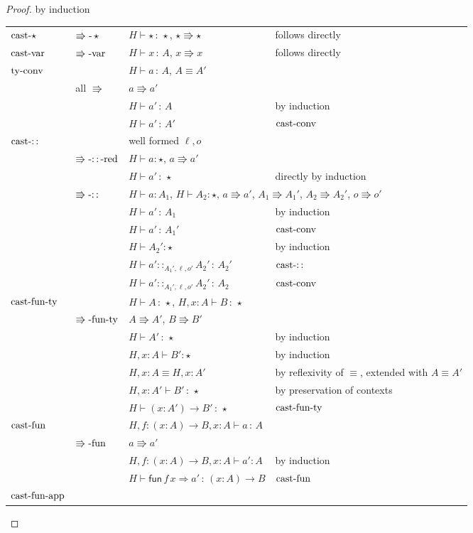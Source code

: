 \begin{proof}
by induction

\begin{tabular}{llll}
$\operatorname{cast-\star}$ & $\operatorname{\Rrightarrow-}\star$ & $H\vdash\star\,:\,\star$, $\star\Rrightarrow\star$ & follows directly\tabularnewline
$\operatorname{cast-var}$ & $\operatorname{\Rrightarrow-var}$ & $H\vdash x\,:\,A$, $x\Rrightarrow x$ & follows directly\tabularnewline
$\operatorname{ty-conv}$ &  & $H\vdash a\,:\,A$, $A\equiv A'$ & \tabularnewline
 & all $\Rrightarrow$ & $a\Rrightarrow a'$ & \tabularnewline
 &  & $H\vdash a'\,:\,A$ & by induction\tabularnewline
 &  & $H\vdash a'\,:\,A'$ & $\operatorname{cast-conv}$\tabularnewline
$\operatorname{cast-::}$ &  & well formed $\ell,o$ & \tabularnewline
 & $\operatorname{\Rrightarrow-::-red}$ & $H\vdash a:\star$, $a\Rrightarrow a'$ & \tabularnewline
 &  & $H\vdash a'\,:\,\star$ & directly by induction\tabularnewline
 & $\operatorname{\Rrightarrow-::}$ & \multicolumn{2}{l}{$H\vdash a:A_{1}$, $H\vdash A_{2}:\star$, $a\Rrightarrow a'$, $A_{1}\Rrightarrow A_{1}'$,
$A_{2}\Rrightarrow A_{2}'$, $o\Rrightarrow o'$}\tabularnewline
 &  & $H\vdash a'\,:\,A_{1}$ & by induction\tabularnewline
 &  & $H\vdash a'\,:\,A_{1}'$ & $\operatorname{cast-conv}$\tabularnewline
 &  & $H\vdash A_{2}':\star$ & by induction\tabularnewline
 &  & $H\vdash a'::_{A_{1}',\ell,o'}A_{2}'\,:\,A_{2}'$ & $\operatorname{cast-::}$\tabularnewline
 &  & $H\vdash a'::_{A_{1}',\ell,o'}A_{2}'\,:\,A_{2}$ & $\operatorname{cast-conv}$\tabularnewline
$\operatorname{cast-fun-ty}$ &  & $H\vdash A\,:\,\star$, $H,x:A\vdash B\,:\,\star$ & \tabularnewline
 & $\operatorname{\Rrightarrow-fun-ty}$ & $A\Rrightarrow A'$, $B\Rrightarrow B'$ & \tabularnewline
 &  & $H\vdash A'\,:\,\star$ & by induction\tabularnewline
 &  & $H,x:A\vdash B':\star$ & by induction\tabularnewline
 &  & $H,x:A\equiv H,x:A'$ & by reflexivity of $\equiv$, extended with $A\equiv A'$\tabularnewline
 &  & $H,x:A'\vdash B'\,:\,\star$ & by preservation of contexts\tabularnewline
 &  & $H\vdash\left(x:A'\right)\rightarrow B'\,:\,\star$ & $\operatorname{cast-fun-ty}$\tabularnewline
$\operatorname{cast-fun}$ &  & $H,f:\left(x:A\right)\rightarrow B,x:A\vdash a\,:\,A$ & \tabularnewline
 & $\operatorname{\Rrightarrow-fun}$ & $a\Rrightarrow a'$ & \tabularnewline
 &  & $H,f:\left(x:A\right)\rightarrow B,x:A\vdash a':A$ & by induction\tabularnewline
 &  & $H\vdash\mathsf{fun}\,f\,x\Rightarrow a'\,:\,\left(x:A\right)\rightarrow B$ & $\operatorname{cast-fun}$\tabularnewline
$\operatorname{cast-fun-app}$ &  &  & \tabularnewline

\end{tabular}
\end{proof}
